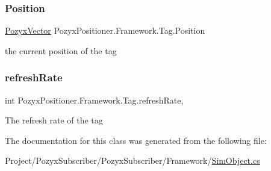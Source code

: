 \subsubsection{\texorpdfstring{Position}{Position}}
{\footnotesize\ttfamily \hyperlink{struct_pozyx_positioner_1_1_framework_1_1_pozyx_vector}{Pozyx\+Vector} Pozyx\+Positioner.\+Framework.\+Tag.\+Position\hspace{0.3cm}{\ttfamily [get]}}



the current position of the tag 

\mbox{\label{class_pozyx_positioner_1_1_framework_1_1_tag_a9010e57016df0a932c5ce8f8584ff5f9}} 
\subsubsection{\texorpdfstring{refresh\+Rate}{refreshRate}}
{\footnotesize\ttfamily int Pozyx\+Positioner.\+Framework.\+Tag.\+refresh\+Rate\hspace{0.3cm}{\ttfamily [get]}, {\ttfamily [set]}}



The refresh rate of the tag 



The documentation for this class was generated from the following file\+:\begin{DoxyCompactItemize}
\item 
Project/\+Pozyx\+Subscriber/\+Pozyx\+Subscriber/\+Framework/\hyperlink{_sim_object_8cs}{Sim\+Object.\+cs}\end{DoxyCompactItemize}
